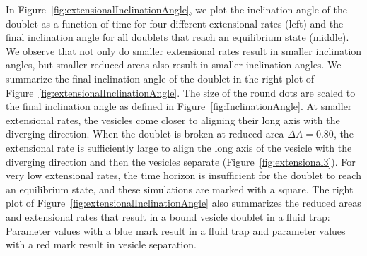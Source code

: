 \documentclass[prf,superscriptaddress,showkeys]{revtex4-1}
\begin{document}
In Figure~\ref{fig:extensionalInclinationAngle}, we plot the inclination
angle of the doublet as a function of time for four different
extensional rates (left) and the final inclination angle for all
doublets that reach an equilibrium state (middle).  We observe that not
only do smaller extensional rates result in smaller inclination angles,
but smaller reduced areas also result in smaller inclination angles.  We
summarize the final inclination angle of the doublet in the right plot
of Figure~\ref{fig:extensionalInclinationAngle}.  The size of the round
dots are scaled to the final inclination angle as defined in
Figure~\ref{fig:InclinationAngle}.  At smaller extensional rates, the
vesicles come closer to aligning their long axis with the diverging
direction.  When the doublet is broken at reduced area $\Delta A =
0.80$, the extensional rate is sufficiently large to align the long axis
of the vesicle with the diverging direction and then the vesicles
separate (Figure~\ref{fig:extensional3}).  For very low extensional
rates, the time horizon is insufficient for the doublet to reach an
equilibrium state, and these simulations are marked with a square.  The
right plot of Figure~\ref{fig:extensionalInclinationAngle} also
summarizes the reduced areas and extensional rates that result in a
bound vesicle doublet in a fluid trap: Parameter values with a blue mark
result in a fluid trap and parameter values with a red mark result in
vesicle separation.
\end{document}
